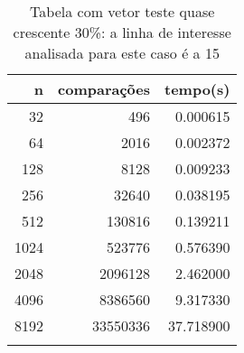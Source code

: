 \begin{table}[ht]
\centering
\begin{tabular}{rrr} \toprule
        n &    comparações &       tempo(s) \\ \midrule
      32  &            496 &      0.000615 \\
      64  &           2016 &      0.002372 \\
     128  &           8128 &      0.009233 \\
     256  &          32640 &      0.038195 \\
     512  &         130816 &      0.139211 \\
    1024  &         523776 &      0.576390 \\
    2048  &        2096128 &      2.462000 \\
    4096  &        8386560 &      9.317330 \\
    8192  &       33550336 &     37.718900 \\
\bottomrule\addlinespace
\end{tabular}
\caption{Tabela com vetor teste quase crescente 30\%: a linha de interesse analisada para este caso é a 15}
\label{tab:bolhaQuaseCresc30}
\end{table}
